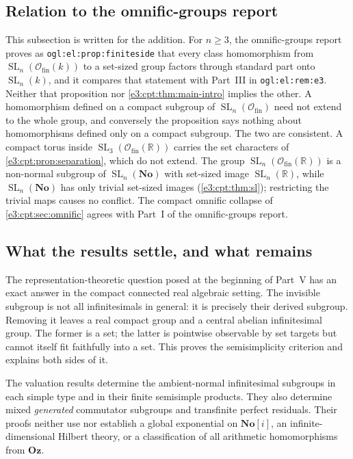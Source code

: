 \documentclass[11pt,letterpaper]{article}
\numberwithin{equation}{section}
\theoremstyle{definition}
\theoremstyle{remark}
\newcommand{\No}{\mathbf{No}}
\newcommand{\R}{\mathbb R}
\newcommand{\Oz}{\mathbf{Oz}}
\newcommand{\SL}{\operatorname{SL}}
\begin{document}
\subsection{Relation to the omnific-groups report}\label{e3:cpt:sub:ogl}

This subsection is written for the addition. For $n\ge3$, the omnific-groups
report \cite{RepoOGL} proves as \texttt{ogl:el:prop:finiteside} that every class
homomorphism from $\SL_n(\mathcal O_{\mathrm{fin}}(k))$ to a
set-sized group factors through standard part onto $\SL_n(k)$, and it compares
that statement with Part~III in \texttt{ogl:el:rem:e3}. Neither
that proposition nor \cref{e3:cpt:thm:main-intro} implies the other. A
homomorphism defined on a compact subgroup of $\SL_n(\mathcal O_{\mathrm{fin}})$
need not extend to the whole group, and conversely the proposition says nothing
about homomorphisms defined only on a compact subgroup. The two are consistent.
A compact torus inside $\SL_3(\mathcal O_{\mathrm{fin}}(\R))$ carries the set
characters of \cref{e3:cpt:prop:separation}, which do not extend. The group
$\SL_n(\mathcal O_{\mathrm{fin}}(\R))$ is a non-normal subgroup of
$\SL_n(\No)$ with set-sized image $\SL_n(\R)$, while $\SL_n(\No)$ has only
trivial set-sized images (\cref{e3:cpt:thm:sl}); restricting the trivial maps
causes no conflict. The compact omnific collapse of \cref{e3:cpt:sec:omnific}
agrees with Part~I of the omnific-groups report.

\subsection{What the results settle, and what remains}\label{e3:cpt:sub:remains}

The representation-theoretic question posed at the beginning of Part~V has an
exact answer in the compact connected real algebraic setting. The invisible
subgroup is not all infinitesimals in general: it is precisely their derived
subgroup. Removing it leaves a real compact group and a central abelian
infinitesimal group. The former is a set; the latter is pointwise observable by
set targets but cannot itself fit faithfully into a set. This proves the
semisimplicity criterion and explains both sides of it.

The valuation results determine the ambient-normal infinitesimal subgroups in
each simple type and in their finite semisimple products. They also determine
mixed \emph{generated} commutator subgroups and transfinite perfect residuals.
Their proofs neither use nor establish a global exponential on $\No[i]$, an
infinite-dimensional Hilbert theory, or a classification of all arithmetic
homomorphisms from $\Oz$.
\end{document}
